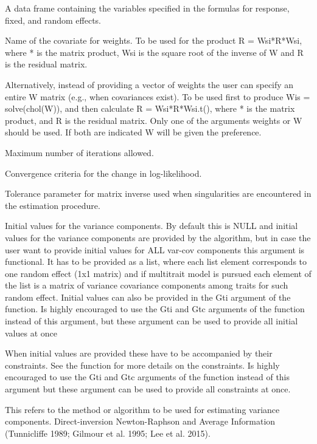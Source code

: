\documentclass[a4paper]{book}
\begin{document}
\begin{Arguments}
\begin{ldescription}
\item[\code{data}] A data frame containing the variables specified in the formulas for response, fixed, and random effects.
\item[\code{weights}] Name of the covariate for weights. To be used for the product R = Wsi*R*Wsi, where * is the matrix product, Wsi is the square root of the inverse of W and R is the residual matrix.
\item[\code{W}] Alternatively, instead of providing a vector of weights the user can specify an entire W matrix (e.g., when covariances exist). To be used first to produce Wis = solve(chol(W)), and then calculate R = Wsi*R*Wsi.t(), where * is the matrix product, and R is the residual matrix. Only one of the arguments weights or W should be used. If both are indicated W will be given the preference.
\item[\code{nIters}] Maximum number of iterations allowed.
\item[\code{tolParConvLL}] Convergence criteria for the change in log-likelihood.
\item[\code{tolParInv}] Tolerance parameter for matrix inverse used when singularities are encountered in the estimation procedure.
\item[\code{init}] Initial values for the variance components. By default this is NULL and initial values for the variance components are provided by the algorithm, but in case the user want to provide initial values for ALL var-cov components this argument is functional. It has to be provided as a list, where each list element corresponds to one random effect (1x1 matrix) and if multitrait model is pursued each element of the list is a matrix of variance covariance components among traits for such random effect. Initial values can also be provided in the Gti argument of the  function. Is highly encouraged to use the Gti and Gtc arguments of the  function instead of this argument, but these argument can be used to provide all initial values at once
\item[\code{constraints}] When initial values are provided these have to be accompanied by their constraints. See the  function for more details on the constraints. Is highly encouraged to use the Gti and Gtc arguments of the  function instead of this argument but these argument can be used to provide all constraints at once.
\item[\code{method}] This refers to the method or algorithm to be used for estimating variance components. Direct-inversion Newton-Raphson  and Average Information  (Tunnicliffe 1989; Gilmour et al. 1995; Lee et al. 2015).

\end{ldescription}
\end{Arguments}
\end{document}
